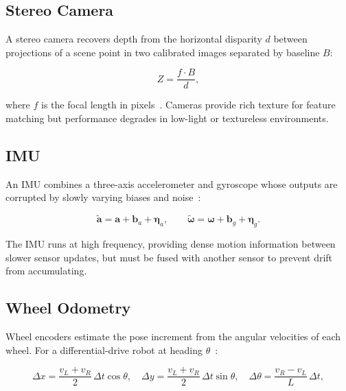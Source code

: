 \subsection{Stereo Camera}

A stereo camera recovers depth from the horizontal disparity $d$ between
projections of a scene point in two calibrated images separated by baseline $B$:

\begin{equation}
  Z = \frac{f \cdot B}{d},
  \label{eq:stereo_depth}
\end{equation}

\noindent where $f$ is the focal length in pixels~\cite{siegwart2004introduction}.
Cameras provide rich texture for feature matching but performance degrades in
low-light or textureless environments.

\subsection{IMU}

An IMU combines a three-axis accelerometer and gyroscope whose outputs are
corrupted by slowly varying biases and noise~\cite{thrun2005probabilistic}:

\begin{equation}
  \tilde{\mathbf{a}} = \mathbf{a} + \mathbf{b}_a + \boldsymbol{\eta}_a, \qquad
  \tilde{\boldsymbol{\omega}} = \boldsymbol{\omega} + \mathbf{b}_g + \boldsymbol{\eta}_g.
  \label{eq:imu_model}
\end{equation}

\noindent The IMU runs at high frequency, providing dense motion information
between slower sensor updates, but must be fused with another sensor to prevent
drift from accumulating.

\subsection{Wheel Odometry}

Wheel encoders estimate the pose increment from the angular velocities of each
wheel. For a differential-drive robot at heading $\theta$~\cite{siegwart2004introduction}:

\begin{equation}
  \Delta x = \frac{v_L + v_R}{2}\,\Delta t\cos\theta, \quad
  \Delta y = \frac{v_L + v_R}{2}\,\Delta t\sin\theta, \quad
  \Delta\theta = \frac{v_R - v_L}{L}\,\Delta t,
  \label{eq:wheel_odom}
\end{equation}

